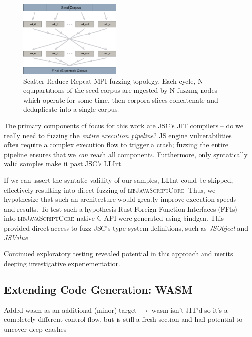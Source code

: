 \begin{figure}[!h]
    \begin{center}
        \includegraphics[width=0.45\textwidth]{./img/fuzzilli-topology}
        \caption{Scatter-Reduce-Repeat MPI fuzzing topology. Each cycle, N-equipartitions of
        the seed corpus are ingested by N fuzzing nodes, which operate for some time, then
        corpora slices concatenate and deduplicate into a single corpus.}
    \end{center}
\end{figure}\vspace{-1em}

 The primary components of focus for this work are JSC's JIT compilers -- do we really need
to fuzzing the \textit{entire execution pipeline}? JS engine vulnerabilities often require a complex execution flow to trigger a
crash; fuzzing the entire pipeline ensures that we \textit{can} reach all components. Furthermore, only syntatically valid samples
make it past JSC's LLInt.

If we can assert the syntatic validity of our samples, LLInt could be skipped, effectively resulting into direct fuzzing
of \textsc{libJavaScriptCore}. Thus, we hypothesize that such an architecture would greatly improve execution speeds and results.
To test such a hypothesis Rust Foreign-Function Interfaces (FFIs) into \textsc{libJavaScriptCore} native C API were
generated using bindgen.%
This provided direct access to fuzz JSC's type system definitions, such as \textit{JSObject} and \textit{JSValue}

Continued exploratory testing revealed potential in this approach and merits deeping investigative experiementation.

\subsection{Extending Code Generation: WASM}
Added wasm as an additional (minor) target $\rightarrow$ wasm isn't
JIT'd so it's a completely different control flow, but is still a
fresh section and had potential to uncover deep crashes

